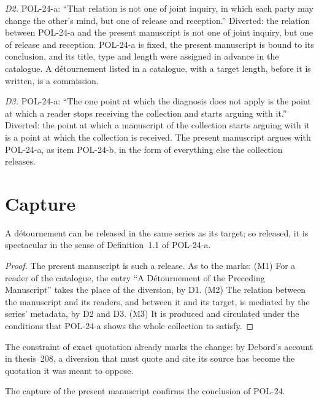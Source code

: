 \documentclass{situationist-preprint}
\begin{document}
\emph{D2.} POL-24-a: \enquote{That relation is not one of joint inquiry, in which each party may change the other's mind, but one of release and reception.} Diverted: the relation between POL-24-a and the present manuscript is not one of joint inquiry, but one of release and reception. POL-24-a is fixed, the present manuscript is bound to its conclusion, and its title, type and length were assigned in advance in the catalogue. A détournement listed in a catalogue, with a target length, before it is written, is a commission.

\emph{D3.} POL-24-a: \enquote{The one point at which the diagnosis does not apply is the point at which a reader stops receiving the collection and starts arguing with it.} Diverted: the point at which a manuscript of the collection starts arguing with it is a point at which the collection is received. The present manuscript argues with POL-24-a, as item POL-24-b, in the form of everything else the collection releases.

\section{Capture}

\begin{proposition}\label{p:capture}
A détournement can be released in the same series as its target; so released, it is spectacular in the sense of Definition~1.1 of POL-24-a.
\end{proposition}

\begin{proof}
The present manuscript is such a release. As to the marks: (M1) For a reader of the catalogue, the entry \enquote{A Détournement of the Preceding Manuscript} takes the place of the diversion, by D1. (M2) The relation between the manuscript and its readers, and between it and its target, is mediated by the series' metadata, by D2 and D3. (M3) It is produced and circulated under the conditions that POL-24-a shows the whole collection to satisfy.
\end{proof}

The constraint of exact quotation already marks the change: by Debord's account in thesis~208, a diversion that must quote and cite its source has become the quotation it was meant to oppose.

\begin{proposition}\label{p:confirms}
The capture of the present manuscript confirms the conclusion of POL-24.
\end{proposition}
\end{document}
